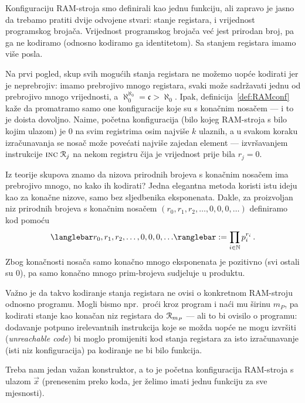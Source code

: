 Konfiguraciju RAM-stroja smo definirali kao jednu funkciju, ali zapravo je jasno da trebamo pratiti dvije odvojene stvari: stanje registara, i vrijednost programskog brojača. Vrijednost programskog brojača već jest prirodan broj, pa ga ne kodiramo (odnosno kodiramo ga identitetom). Sa stanjem registara imamo više posla.

Na prvi pogled, skup svih mogućih stanja registara ne možemo uopće kodirati jer je neprebrojiv: imamo prebrojivo mnogo registara, svaki može sadržavati jednu od prebrojivo mnogo vrijednosti, a $\aleph_0^{\aleph_0}=\mathfrak c>\aleph_0$. Ipak, definicija~\ref{def:RAMconf} kaže da promatramo samo one konfiguracije koje su s konačnim nosačem --- i to je doista dovoljno. Naime, početna konfiguracija (bilo kojeg RAM-stroja s bilo kojim ulazom) je $0$ na svim registrima osim najviše $k$ ulaznih, a u svakom koraku izračunavanja se nosač može povećati najviše zajedan element --- izvršavanjem instrukcije $\textsc{inc}\;\mathcal R_{j}$ na nekom registru čija je vrijednost prije bila $r_j=0$.

Iz teorije skupova znamo da nizova prirodnih brojeva s konačnim nosačem ima prebrojivo mnogo, no kako ih kodirati? Jedna elegantna metoda koristi istu ideju kao za konačne nizove, samo bez sljedbenika eksponenata. Dakle, za proizvoljan niz prirodnih brojeva s konačnim nosačem $(r_0,r_1,r_2,\dotsc,0,0,0,\dotsc)$ definiramo kod pomoću
\begin{equation}\label{eq:defkreg}
    \knk{r_0,r_1,r_2,\dotsc,0,0,0,\dotsc}:=\prod_{i\in\N}p_i^{r_i}\,\text.
\end{equation}
Zbog konačnosti nosača samo konačno mnogo eksponenata je pozitivno (svi ostali su $0$), pa samo konačno mnogo prim-brojeva sudjeluje u produktu.

Važno je da takvo kodiranje stanja registara ne ovisi o konkretnom RAM-stroju odnosno programu. Mogli bismo npr.\ proći kroz program i naći mu širinu $m_P$, pa kodirati stanje kao konačan niz registara do $\mathcal R_{m_P}$ --- ali to bi ovisilo o programu: dodavanje potpuno irelevantnih instrukcija koje se možda uopće ne mogu izvršiti (\emph{unreachable code}) bi moglo promijeniti kod stanja registara za isto izračunavanje (isti niz konfiguracija) pa kodiranje ne bi bilo funkcija.

Treba nam jedan važan konstruktor, a to je %
početna konfiguracija RAM-stroja s ulazom $\vec x$ (prenesenim preko koda, jer želimo imati jednu funkciju za sve mjesnosti).

